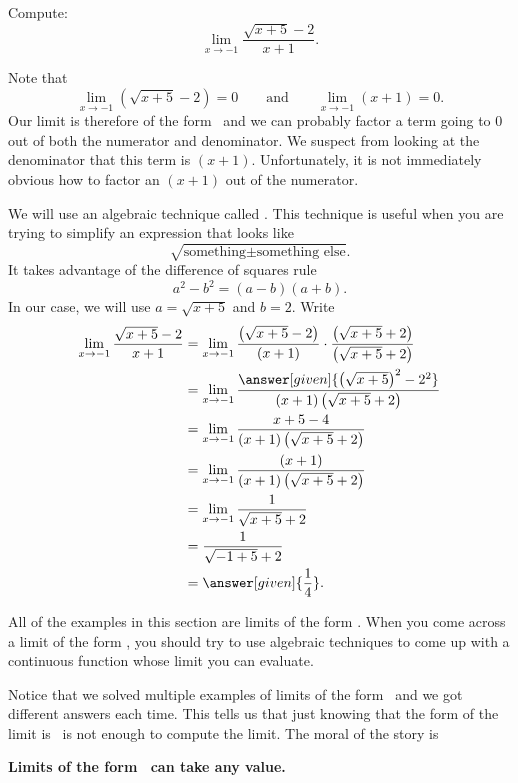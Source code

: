 \documentclass{ximera}
\begin{document}
\begin{example}
  Compute:
  \[
  \lim_{x\to-1} \frac{\sqrt{x+5}-2}{x+1}.
  \]

\begin{explanation} 
  Note that 
  \[
  \lim_{x\to-1} \left(\sqrt{x+5}-2\right)=0\qquad\text{and}\qquad\lim_{x\to -1} \left(x+1\right) =0.
  \]
  Our limit is therefore of the form \zeroOverZero\ and we
  can probably factor a term going to $0$ out of both the numerator
  and denominator.  We suspect from looking at the denominator that
  this term is $(x+1)$.  Unfortunately, it is not immediately obvious
  how to factor an $(x+1)$ out of the numerator.
 
  We will use an algebraic technique called .  This technique is useful when you are trying to
  simplify an expression that looks like
  \[
  \sqrt{\text{something} \pm \text{something else}}.
  \]
  It takes advantage of the difference of squares rule 
  \[
  a^2-b^2=(a-b)(a+b).
  \]
  In our case, we will use $a=\sqrt{x+5}$ and $b=2$.  Write
\begin{align*}
\lim_{x\to-1} \frac{\sqrt{x+5}-2}{x+1}&=
\lim_{x\to-1} \frac{\left(\sqrt{x+5}-2\right)}{(x+1)} \cdot \frac{\left(\sqrt{x+5}+2\right)}{\left(\sqrt{x+5}+2\right)} \\
&=\lim_{x\to-1} \frac{\answer[given]{\left(\sqrt{x+5}\right)^2-2^2}}{(x+1)\left(\sqrt{x+5}+2\right)} \\
&=\lim_{x\to-1} \frac{x+5-4}{(x+1)\left(\sqrt{x+5}+2\right)} \\
&=\lim_{x\to-1} \frac{(x+1)}{(x+1)\left(\sqrt{x+5}+2\right)} \\
&=\lim_{x\to-1} \frac{1}{\sqrt{x+5}+2}\\
&= \frac{1}{\sqrt{-1+5}+2}\\
&=\answer[given]{\frac{1}{4}}.
\end{align*}
\end{explanation}
\end{example}

All of the examples in this section are limits of the form \zeroOverZero.
When you come across a limit of the form \zeroOverZero, you should try
to use algebraic techniques to come up with a continuous
function whose limit you can evaluate.

Notice that we solved multiple examples of limits of the form
\zeroOverZero\ and we got different answers each time.  This tells us
that just knowing that the form of the limit is \zeroOverZero\ is not enough
to compute the limit. The moral of the story is
\begin{center}
  \textbf{Limits of the form \zeroOverZero\ can take any value.}
\end{center}
\end{document}
